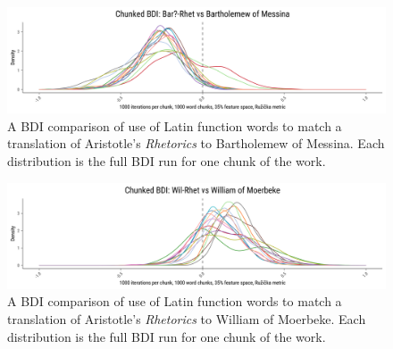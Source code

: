 \documentclass[
    hf
]{ceurart}
\begin{document}
\begin{figure}
    \includegraphics[width=\linewidth]{figures/bdi_bar_paper.png}
    \caption{A BDI comparison of use of Latin function words to match a
        translation of Aristotle's \emph{Rhetorics} to Bartholemew of Messina. Each
        distribution is the full BDI run for one chunk of the work.}
    \label{fig:trans_bar}
\end{figure}

\begin{figure}
    \includegraphics[width=\linewidth]{figures/bdi_wil_paper.png}
    \caption{A BDI comparison of use of Latin function words to match a
        translation of Aristotle's \emph{Rhetorics} to William of Moerbeke. Each
        distribution is the full BDI run for one chunk of the work.}
    \label{fig:trans_wil}
\end{figure}
\end{document}
